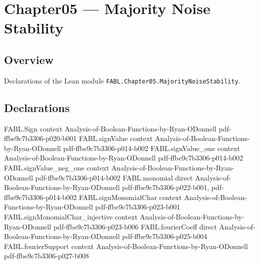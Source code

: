 \chapter{Chapter05 — Majority Noise Stability}
\section{Overview}

Declarations of the Lean module \texttt{FABL.Chapter05.MajorityNoiseStability}.

\section{Declarations}

\begin{theorem}
\label{FABL.fourierWeightAtLevel_majority_odd_eq_zero_of_even}
\leanok
{}
\proofstep
  {FABL.Sign}
  {context}
  {Analysis-of-Boolean-Functions-by-Ryan-ODonnell}
  {pdf-ffbe9c7b3306-p020-b001}
\proofstep
  {FABL.signValue}
  {context}
  {Analysis-of-Boolean-Functions-by-Ryan-ODonnell}
  {pdf-ffbe9c7b3306-p014-b002}
\proofstep
  {FABL.signValue_one}
  {context}
  {Analysis-of-Boolean-Functions-by-Ryan-ODonnell}
  {pdf-ffbe9c7b3306-p014-b002}
\proofstep
  {FABL.signValue_neg_one}
  {context}
  {Analysis-of-Boolean-Functions-by-Ryan-ODonnell}
  {pdf-ffbe9c7b3306-p014-b002}
\proofstep
  {FABL.monomial}
  {direct}
  {Analysis-of-Boolean-Functions-by-Ryan-ODonnell}
  {pdf-ffbe9c7b3306-p022-b001,
    pdf-ffbe9c7b3306-p014-b002}
\proofstep
  {FABL.signMonomialChar}
  {context}
  {Analysis-of-Boolean-Functions-by-Ryan-ODonnell}
  {pdf-ffbe9c7b3306-p023-b001}
\proofstep
  {FABL.signMonomialChar_injective}
  {context}
  {Analysis-of-Boolean-Functions-by-Ryan-ODonnell}
  {pdf-ffbe9c7b3306-p023-b006}
\proofstep
  {FABL.fourierCoeff}
  {direct}
  {Analysis-of-Boolean-Functions-by-Ryan-ODonnell}
  {pdf-ffbe9c7b3306-p025-b004}
\proofstep
  {FABL.fourierSupport}
  {context}
  {Analysis-of-Boolean-Functions-by-Ryan-ODonnell}
  {pdf-ffbe9c7b3306-p027-b008}

\end{theorem}
